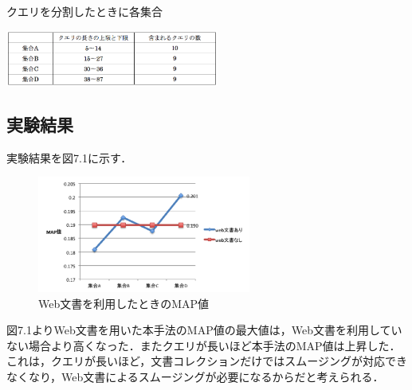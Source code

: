 \begin{table}
    \centering
    \caption{クエリを分割したときに各集合}
    \includegraphics[width=7cm]{./image/query_set.png}
    \label{query_set}
\end{table}

\subsection{実験結果}
実験結果を図7.1に示す．

\begin{figure}
    \centering
    \includegraphics[width=7cm]{./image/web_result.png}
    \caption{Web文書を利用したときのMAP値}
    \label{web_result1}
\end{figure}

図7.1よりWeb文書を用いた本手法のMAP値の最大値は，Web文書を利用していない場合より高くなった．またクエリが長いほど本手法のMAP値は上昇した．これは，クエリが長いほど，文書コレクションだけではスムージングが対応できなくなり，Web文書によるスムージングが必要になるからだと考えられる．

